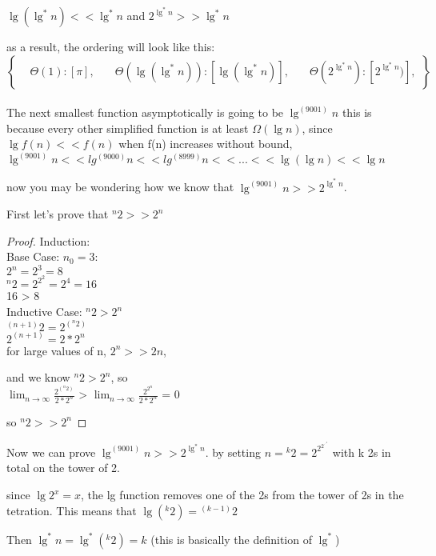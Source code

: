 \documentclass[11pt,fleqn]{article}
\theoremstyle{definition}
\theoremstyle{remark}
\begin{document}
$\lg(\lg^*n) << \lg^*n$ and $2^{\lg^*n} >> \lg^*n$

as a result, the ordering will look like this:\\

\[
\left\{
\begin{aligned}
& \Theta(1): [\pi],
& \quad \Theta(\lg(\lg^*n)): [\lg(\lg^*n)],
& \quad \Theta(2^{\lg^*n}): [2^{\lg^*n})],
\end{aligned}
\right\}
\]\\

The next smallest function asymptotically is going to be $\lg^{(9001)} n$
this is because every other simplified function is at least $\Omega(\lg n)$,
since $\lg{f(n)} << f(n)$ when f(n) increases without bound, 
$\lg^{(9001)} n << lg^{(9000)} n << lg^{(8999)} n << ... << \lg (\lg n) << \lg n$ 

now you may be wondering how we know that $\lg^{(9001)} n >> 2^{\lg^*n}$.

First let's prove that ${}^n 2 >> 2^n$

\begin{proof}
Induction:\\

Base Case: $n_0 = 3$:\\
$2^n = 2^3 = 8$\\
${}^n 2 = 2^{2^2} = 2^4 = 16$\\
16 > 8\\

Inductive Case: ${}^n 2 > 2^n$\\
${}^{(n+1)} 2 = 2^{({}^n 2)}$\\
$2^{(n+1)} = 2 * 2^n$\\

for large values of n, $2^n >> 2n$,

and we know ${}^n 2 > 2^n$, so\\

$\lim_{n \to \infty} \frac{2^{({}^n 2)}}{2*2^n}$ >
$\lim_{n \to \infty} \frac{2^{2^n}}{2*2^n}$ = 0

so ${}^n 2 >> 2^n$
\end{proof}
Now we can prove $\lg^{(9001)} n >> 2^{\lg^*n}$. by setting $n = {}^k 2 = 2^{2^{2^{\cdot^{\cdot^{\cdot 2}}}}}$ with k
2s in total on the tower of 2.

since $\lg2^x = x$, the lg function removes one of the 2s from
the tower of 2s in the tetration. This means that $\lg{({}^k 2)} = {}^{(k-1)} 2$

Then $\lg^*n = \lg^*{({}^k 2)} = k$ (this is basically the definition of $\lg^*$)
\end{document}
